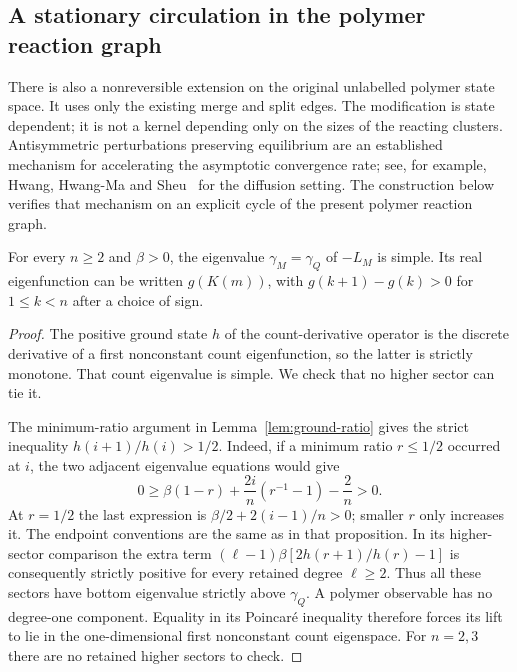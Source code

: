 \subsection{A stationary circulation in the polymer reaction graph}
\label{sec:polymer-circulation}

There is also a nonreversible extension on the original unlabelled
polymer state space.  It uses only the existing merge and split edges.
The modification is state dependent; it is not a kernel depending
only on the sizes of the reacting clusters.
Antisymmetric perturbations preserving equilibrium are an established
mechanism for accelerating the asymptotic convergence rate; see, for
example, Hwang, Hwang-Ma and Sheu~\cite{HwangHwangMaSheu2005} for the
diffusion setting.  The construction below verifies that mechanism on
an explicit cycle of the present polymer reaction graph.

\begin{lemma}\label{lem:simple-polymer-gap}
For every $n\ge2$ and $\beta>0$, the eigenvalue $\gamma_M=\gamma_Q$
of $-L_M$ is simple.  Its real eigenfunction can be written $g(K(m))$,
with $g(k+1)-g(k)>0$ for $1\le k<n$ after a choice of sign.
\end{lemma}

\begin{proof}
The positive ground state $h$ of the count-derivative operator is
the discrete derivative of a first nonconstant count eigenfunction,
so the latter is strictly monotone.  That count eigenvalue is simple.
We check that no higher sector can tie it.

The minimum-ratio argument in Lemma~\ref{lem:ground-ratio} gives the strict inequality
$h(i+1)/h(i)>1/2$.
Indeed, if a minimum ratio $r\le1/2$ occurred at $i$, the two adjacent
eigenvalue equations would give
\[
 0\ge\beta(1-r)+\frac{2i}{n}(r^{-1}-1)-\frac2n>0.
\]
At $r=1/2$ the last expression is
$\beta/2+2(i-1)/n>0$; smaller $r$ only increases it.
The endpoint conventions are the same as in that proposition.
In its higher-sector comparison the extra term
$(\ell-1)\beta[2h(r+1)/h(r)-1]$ is consequently strictly positive
for every retained degree $\ell\ge2$.
Thus all these sectors have bottom eigenvalue strictly above
$\gamma_Q$.  A polymer observable has no degree-one component.
Equality in its Poincar\'e inequality therefore forces its lift
to lie in the one-dimensional first nonconstant count eigenspace.
For $n=2,3$ there are no retained higher sectors to check.
\end{proof}

